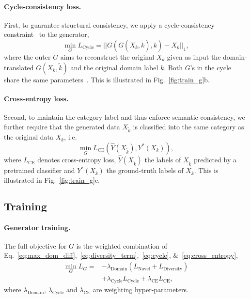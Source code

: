 \documentclass[runningheads]{llncs}
\begin{document}
\paragraph{Cycle-consistency loss.}
First, to guarantee structural consistency, we apply a cycle-consistency constraint~\cite{CycleGAN} to the generator,
\begin{equation} \label{eq:cycle}
\min_G L_{\mathrm{Cycle}} = || G(G(X_k, \tilde{k}), k) - X_k ||_1,
\end{equation}
where the outer $G$ aims to reconstruct the original $X_k$ given as input the domain-translated $G(X_k, \tilde{k})$ and the original domain label $k$. Both $G$'s in the cycle share the same parameters~\cite{StarGAN}. This is illustrated in Fig.~\ref{fig:train_g}b.

\paragraph{Cross-entropy loss.}
Second, to maintain the category label and thus enforce semantic consistency, we further require that the generated data $X_{\tilde{k}}$ is classified into the same category as the original data $X_k$, i.e.
\begin{equation} \label{eq:cross_entropy}
\min_G L_{\mathrm{CE}} ( \hat{Y}(X_{\tilde{k}}), Y^*(X_k) ),
\end{equation}
where $L_{\mathrm{CE}}$ denotes cross-entropy loss, $\hat{Y}(X_{\tilde{k}})$ the labels of $X_{\tilde{k}}$ predicted by a pretrained classifier and $Y^*(X_k)$ the ground-truth labels of $X_k$. This is illustrated in Fig.~\ref{fig:train_g}c.

\subsection{Training}
\paragraph{Generator training.}
The full objective for $G$ is the weighted combination of Eq.~\eqref{eq:max_dom_diff},~\eqref{eq:diversity_term},~\eqref{eq:cycle}, \&~\eqref{eq:cross_entropy},
\begin{equation} \label{eq:full_obj_g}
\begin{split}
\min_G L_G =
 & - \lambda_{\mathrm{Domain}} (L_{\mathrm{Novel}} + L_{\mathrm{Diversity}}) \\
 & + \lambda_{\mathrm{Cycle}} L_{\mathrm{Cycle}} + \lambda_{\mathrm{CE}} L_{\mathrm{CE}},
\end{split}
\end{equation}
where $\lambda_{\mathrm{Domain}}$, $\lambda_{\mathrm{Cycle}}$ and $\lambda_{\mathrm{CE}}$ are weighting hyper-parameters.
\end{document}

